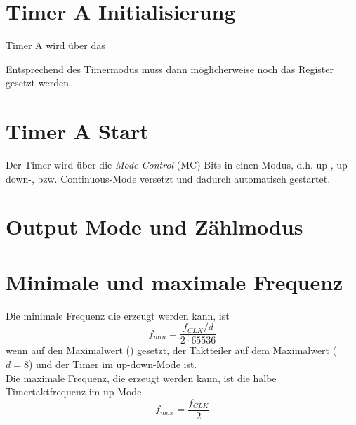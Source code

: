 \documentclass[a4paper, 12pt]{article}
\begin{document}
  
  \clearpage
  \setcounter{page}{1}
  \section{Timer A Initialisierung}
  Timer A wird über das 

  Entsprechend des Timermodus muss dann möglicherweise noch das  Register
  gesetzt werden.
  
  \section{Timer A Start}
  Der Timer wird über die \emph{Mode Control} (MC) Bits in einen Modus, d.h.
  up-, up-down-, bzw. Continuous-Mode versetzt und dadurch automatisch gestartet.  

  \section{Output Mode und Zählmodus}

  \section{Minimale und maximale Frequenz}
  Die minimale Frequenz die erzeugt werden kann, ist
  \[f_{min} = \frac{f_{CLK}/d}{2\cdot 65536}\]
  wenn  auf den
  Maximalwert () gesetzt, der Taktteiler auf dem Maximalwert
  ($d=8$) und der Timer im up-down-Mode ist.\\

  Die maximale Frequenz, die erzeugt werden kann, ist die halbe
  Timertaktfrequenz im up-Mode
  \[f_{max} = \frac{f_{CLK}}{2}\]
  


 
\end{document}
